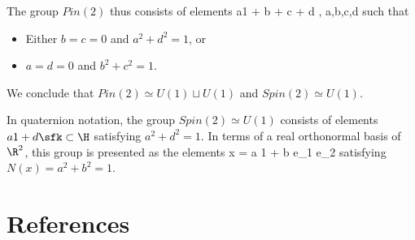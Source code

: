 \documentclass[../main.tex]{subfiles}
\begin{document}
The group $Pin(2)$ thus consists of elements
\beqn
a1 + b \sfi + c \sfj + d \sfk , \quad a,b,c,d \in \R
\eeqn
such that
\begin{itemize}
\item Either $b=c=0$ and $a^2 + d^2 = 1$, or
\item $a=d=0$ and $b^2 + c^2 = 1$.
\end{itemize}
We conclude that $Pin(2) \simeq U(1) \sqcup U(1)$ and $Spin(2) \simeq U(1)$.

In quaternion notation, the group $Spin(2) \simeq U(1)$ consists of elements $a 1 + d \sfk \subset \H$ satisfying $a^2 + d^2 = 1$.
In terms of a real orthonormal basis of $\R^2$, this group is presented as the elements
\beqn
x = a 1 + b e_1 e_2 
\eeqn
satisfying $N(x) = a^2 + b^2 = 1$.


%
%
%
%

\section*{References}
\printbibliography[heading=none]
\end{document}
